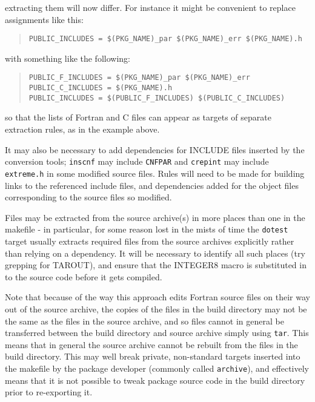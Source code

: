 \documentclass[twoside,11pt]{article}
\newcommand{\htmlref}[2]{#1}
\renewcommand{\_}{\texttt{\symbol{95}}}
\newcommand{\xroutine}[1]{\htmlref{{\tt #1}}{#1}}
\newcommand{\file}[1]{{\tt #1}}
\newenvironment{squote}{\begin{quote}\begin{small}}{\end{small}\end{quote}}
\begin{document}
extracting them will now differ.
For instance it might be convenient to replace assignments like this:
\begin{squote}
\begin{verbatim}
PUBLIC_INCLUDES = $(PKG_NAME)_par $(PKG_NAME)_err $(PKG_NAME).h
\end{verbatim}
\end{squote}
with something like the following:
\begin{squote}
\begin{verbatim}
PUBLIC_F_INCLUDES = $(PKG_NAME)_par $(PKG_NAME)_err
PUBLIC_C_INCLUDES = $(PKG_NAME).h
PUBLIC_INCLUDES = $(PUBLIC_F_INCLUDES) $(PUBLIC_C_INCLUDES)
\end{verbatim}
\end{squote}
so that the lists of Fortran and C files can appear as targets of
separate extraction rules, as in the example above.

It may also be necessary to add dependencies for INCLUDE files inserted
by the conversion tools; \xroutine{inscnf} may include \file{CNF\_PAR}
and \xroutine{crepint} may include \file{extreme.h}
in some modified source files.
Rules will need to be made for building links to the referenced
include files, and dependencies added for the object files corresponding
to the source files so modified.

Files may be extracted from the source archive(s) in more places than
one in the makefile - in particular, for some reason lost in the
mists of time the {\tt do\_test} target
usually extracts required files from the source archives explicitly
rather than relying on a dependency.
It will be necessary to identify all such places
(try grepping for TAR\_OUT), and ensure that
the INTEGER8 macro is substituted in to the source code before it
gets compiled.

Note that because of the way this approach edits Fortran source files on
their way out of the source archive,
the copies of the files in the build directory may not be the same
as the files in the source archive, and so files cannot in general
be transferred between the build directory and source archive
simply using {\tt tar}.
This means that in general the source archive cannot be rebuilt
from the files in the build directory.
This may well break private, non-standard targets inserted into the
makefile by the package developer (commonly called {\tt archive}),
and effectively means that it is not possible to tweak package source
code in the build directory prior to re-exporting it.
\end{document}
